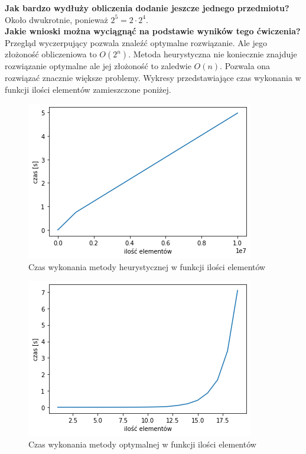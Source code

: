 \documentclass{article}
\begin{document}
\noindent \textbf{Jak bardzo wydłuży obliczenia dodanie jeszcze jednego przedmiotu?}\\
Około dwukrotnie, ponieważ $2^5 = 2 \cdot 2^4$.\\

\noindent \textbf{Jakie wnioski można wyciągnąć na podstawie wyników tego ćwiczenia?}\\
Przegląd wyczerpujący pozwala znaleźć optymalne rozwiązanie. Ale jego złożoność obliczeniowa to 
$O(2^n)$. Metoda heurystyczna nie koniecznie znajduje rozwiązanie optymalne ale jej złożoność to zaledwie $O(n)$. Pozwala ona rozwiązać znacznie większe problemy. Wykresy przedstawiające czas wykonania w funkcji ilości elementów zamieszczone poniżej. \\

\begin{figure}[!h]
    \centering \includegraphics[width=0.8\linewidth]{wsi_1.png}
    \caption{Czas wykonania metody heurystycznej w funkcji ilości elementów}
\end{figure}

\begin{figure}[!h]
    \centering \includegraphics[width=0.8\linewidth]{wsi_2.png}
    \caption{Czas wykonania metody optymalnej w funkcji ilości elementów}
\end{figure}
\end{document}
